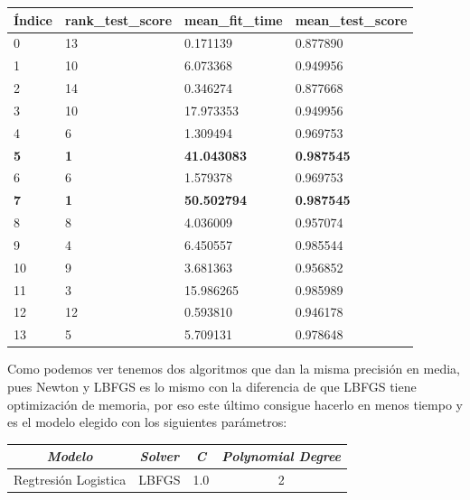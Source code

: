 \documentclass[a4paper,11pt]{article}
\begin{document}
\begin{table}[h]
\begin{tabular}{|l|l|l|l|}
\hline
Índice     & rank\_test\_score & mean\_fit\_time    & mean\_test\_score \\ \hline
0          & 13                & 0.171139           & 0.877890          \\ \hline
1          & 10                & 6.073368           & 0.949956          \\ \hline
2          & 14                & 0.346274           & 0.877668          \\ \hline
3          & 10                & 17.973353          & 0.949956          \\ \hline
4          & 6                 & 1.309494           & 0.969753          \\ \hline
\textbf{5} & \textbf{1}        & \textbf{41.043083} & \textbf{0.987545} \\ \hline
6          & 6                 & 1.579378           & 0.969753          \\ \hline
\textbf{7} & \textbf{1}        & \textbf{50.502794} & \textbf{0.987545} \\ \hline
8          & 8                 & 4.036009           & 0.957074          \\ \hline
9          & 4                 & 6.450557           & 0.985544          \\ \hline
10         & 9                 & 3.681363           & 0.956852          \\ \hline
11         & 3                 & 15.986265          & 0.985989          \\ \hline
12         & 12                & 0.593810           & 0.946178          \\ \hline
13         & 5                 & 5.709131           & 0.978648          \\ \hline
\end{tabular}
\end{table}

Como podemos ver tenemos dos algoritmos que dan la misma precisión en media, pues Newton y LBFGS es lo mismo con la diferencia de que LBFGS tiene optimización de memoria, por eso este último consigue hacerlo en menos tiempo y es el modelo elegido con los siguientes parámetros:

\begin{table}[h]
\begin{tabular}{|c|c|c|c|}
\hline
\textit{\textbf{Modelo}} & \textit{\textbf{Solver}} & \textit{\textbf{C}} & \textit{\textbf{Polynomial Degree}} \\ \hline
Regtresión Logistica     & LBFGS                    & 1.0                 & 2                                   \\ \hline
\end{tabular}
\end{table}
\end{document}
